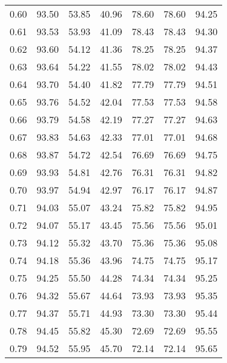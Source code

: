 \begin{tabular}{|c|c|c|c|c|c|c|}
      0.60 &     93.50 &     53.85 &      40.96 &   78.60 &      78.60 &         94.25 \\
      0.61 &     93.53 &     53.93 &      41.09 &   78.43 &      78.43 &         94.30 \\
      0.62 &     93.60 &     54.12 &      41.36 &   78.25 &      78.25 &         94.37 \\
      0.63 &     93.64 &     54.22 &      41.55 &   78.02 &      78.02 &         94.43 \\
      0.64 &     93.70 &     54.40 &      41.82 &   77.79 &      77.79 &         94.51 \\
      0.65 &     93.76 &     54.52 &      42.04 &   77.53 &      77.53 &         94.58 \\
      0.66 &     93.79 &     54.58 &      42.19 &   77.27 &      77.27 &         94.63 \\
      0.67 &     93.83 &     54.63 &      42.33 &   77.01 &      77.01 &         94.68 \\
      0.68 &     93.87 &     54.72 &      42.54 &   76.69 &      76.69 &         94.75 \\
      0.69 &     93.93 &     54.81 &      42.76 &   76.31 &      76.31 &         94.82 \\
      0.70 &     93.97 &     54.94 &      42.97 &   76.17 &      76.17 &         94.87 \\
      0.71 &     94.03 &     55.07 &      43.24 &   75.82 &      75.82 &         94.95 \\
      0.72 &     94.07 &     55.17 &      43.45 &   75.56 &      75.56 &         95.01 \\
      0.73 &     94.12 &     55.32 &      43.70 &   75.36 &      75.36 &         95.08 \\
      0.74 &     94.18 &     55.36 &      43.96 &   74.75 &      74.75 &         95.17 \\
      0.75 &     94.25 &     55.50 &      44.28 &   74.34 &      74.34 &         95.25 \\
      0.76 &     94.32 &     55.67 &      44.64 &   73.93 &      73.93 &         95.35 \\
      0.77 &     94.37 &     55.71 &      44.93 &   73.30 &      73.30 &         95.44 \\
      0.78 &     94.45 &     55.82 &      45.30 &   72.69 &      72.69 &         95.55 \\
      0.79 &     94.52 &     55.95 &      45.70 &   72.14 &      72.14 &         95.65 \\

\end{tabular}
